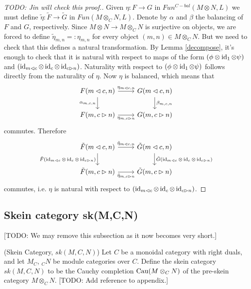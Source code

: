 \begin{proof}
  [TODO: Jin will check this proof.]
  Given $\eta:F\to G$ in $Fun^{C-bal}(M\otimes N,L)$ we must define
  $\tilde{\eta}:\tilde{F}\to\tilde{G}$ in $Fun(M\otimes_C N,L)$. Denote by
  $\alpha$ and $\beta$ the balancing of $F$ and $G$, respectively. Since
  $M\otimes N\to M\otimes_C N$ is surjective on objects, we are forced to
  define $\tilde{\eta}_{m,n}=:\eta_{m,n}$ for every object
  $(m,n)\in M\otimes_C N$. But we need to check that this defines a natural
  transformation. By Lemma \ref{decompose}, it's enough to check that it is
  natural with respect to maps of the form $(\phi\otimes\operatorname{id}_1\otimes\psi)$ and
  $(\operatorname{id}_{m\lhd c}\otimes\operatorname{id}_c\otimes\operatorname{id}_{c\rhd n})$. Naturality with respect
  to $(\phi\otimes\operatorname{id}_1\otimes\psi)$ follows directly from the naturality of
  $\eta$. Now $\eta$ is balanced, which means that
  \[
    \begin{tikzcd}
      {F(m\lhd c, n)} & {G(m\lhd c, n)} \\
      {F(m,c\rhd n)} & {G(m,c\rhd n)}
      \arrow["{\eta_{m\lhd c, n}}", from=1-1, to=1-2]
      \arrow["{\alpha_{m,c,n}}"', from=1-1, to=2-1]
      \arrow["{\beta_{m,c,n}}", from=1-2, to=2-2]
      \arrow["{\eta_{m,c\rhd n}}"', from=2-1, to=2-2]
    \end{tikzcd}\]
  commutes. Therefore
  \[
    \begin{tikzcd}
      {\tilde{F}(m\lhd c, n)} & {\tilde{G}(m\lhd c, n)} \\
      {\tilde{F}(m,c\rhd n)} & {\tilde{G}(m,c\rhd n)}
      \arrow["{\tilde{\eta}_{m\lhd c, n}}", from=1-1, to=1-2]
      \arrow["{\tilde{F}(\id_{m\lhd c}\otimes\id_c\otimes\id_{c\rhd n})}"', from=1-1, to=2-1]
      \arrow["{\tilde{G}(\id_{m\lhd c}\otimes\id_c\otimes\id_{c\rhd n})}", from=1-2, to=2-2]
      \arrow["{\tilde{\eta}_{m,c\rhd n}}"', from=2-1, to=2-2]
    \end{tikzcd}
  \]
  commutes, i.e. $\eta$ is natural with respect to
  $(\operatorname{id}_{m\lhd c}\otimes\operatorname{id}_c\otimes\operatorname{id}_{c\rhd n})$.
\end{proof}

\subsection{Skein category sk(M,C,N)}

[TODO: We may remove this subsection as it now becomes very short.]

\begin{definition} (Skein Category, $sk(M,C,N)$)
  Let $C$ be a monoidal category with right duals, and let $M_C$, $_{C}N$ be module
  categories over $C$. Define the skein category $sk(M,C,N)$ to be the Cauchy completion $\operatorname{Cau}(M \otimes_{C} N)$ of the pre-skein category $M \otimes_{C} N$. [TODO: Add reference to appendix.]
\end{definition}

